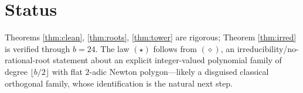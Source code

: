 \documentclass[11pt]{article}
\theoremstyle{definition}
\begin{document}
\section{Status}
Theorems \ref{thm:clean}, \ref{thm:roots}, \ref{thm:tower} are rigorous;
Theorem \ref{thm:irred} is verified through $b=24$. The law $(\star)$ follows from
$(\diamond)$, an irreducibility/no-rational-root statement about an explicit integer-valued
polynomial family of degree $\lfloor b/2\rfloor$ with flat $2$-adic Newton polygon---likely a
disguised classical orthogonal family, whose identification is the natural next step.
\end{document}

